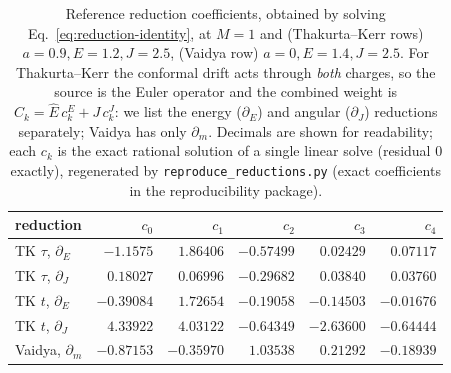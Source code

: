 \documentclass[12pt]{iopart}
\newcommand{\Ehat}{\hat E}
\begin{document}
\begin{table}[htbp]
    \centering
    \caption{Reference reduction coefficients, obtained by solving
    Eq.~\eqref{eq:reduction-identity}, at $M{=}1$ and (Thakurta--Kerr rows)
    $a{=}0.9,E{=}1.2,J{=}2.5$, (Vaidya row) $a{=}0,E{=}1.4,J{=}2.5$. For
    Thakurta--Kerr the conformal drift acts through \emph{both} charges, so the source
    is the Euler operator and the combined weight is $C_k=\Ehat\,c_k^{E}+J\,c_k^{J}$:
    we list the energy ($\partial_E$) and angular ($\partial_J$) reductions separately;
    Vaidya has only $\partial_m$. Decimals are shown for readability; each $c_k$ is the
    exact rational solution of a single linear solve (residual $0$ exactly), regenerated
    by \texttt{reproduce\_reductions.py} (exact coefficients in the reproducibility
    package).}
    \label{tab:reduction-ck}
    \small
    \begin{tabular}{lrrrrr}
        \hline\hline
        reduction & $c_0$ & $c_1$ & $c_2$ & $c_3$ & $c_4$\\
        \hline
        TK $\tau$, $\partial_E$ & $-1.1575$ & $1.86406$ & $-0.57499$ & $0.02429$ & $0.07117$\\
        TK $\tau$, $\partial_J$ & $0.18027$ & $0.06996$ & $-0.29682$ & $0.03840$ & $0.03760$\\
        TK $t$, $\partial_E$ & $-0.39084$ & $1.72654$ & $-0.19058$ & $-0.14503$ & $-0.01676$\\
        TK $t$, $\partial_J$ & $4.33922$ & $4.03122$ & $-0.64349$ & $-2.63600$ & $-0.64444$\\
        Vaidya, $\partial_m$ & $-0.87153$ & $-0.35970$ & $1.03538$ & $0.21292$ & $-0.18939$\\
        \hline\hline
    \end{tabular}
\end{table}
\end{document}
